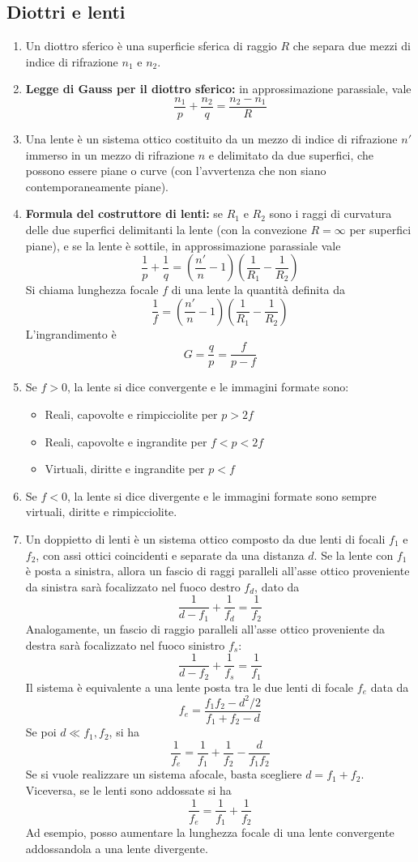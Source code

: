 \documentclass[a4paper,11pt]{article}
\begin{document}
\subsection{Diottri e lenti}
\begin{enumerate}[resume]
	\item Un diottro sferico è una superficie sferica di raggio $R$ che separa due mezzi di indice di rifrazione $n_1$ e $n_2$.
	\item\textbf{Legge di Gauss per il diottro sferico:} in approssimazione parassiale, vale
	\[\frac{n_1}{p}+\frac{n_2}{q}=\frac{n_2-n_1}{R}\]
	\item Una lente è un sistema ottico costituito da un mezzo di indice di rifrazione $n'$ immerso in un mezzo di rifrazione $n$ e delimitato da due superfici, che possono essere piane o curve (con l'avvertenza che non siano contemporaneamente piane).
	\item\textbf{Formula del costruttore di lenti:} se $R_1$ e $R_2$ sono i raggi di curvatura delle due superfici delimitanti la lente (con la convezione $R=\infty$ per superfici piane), e se la lente è sottile, in approssimazione parassiale vale
	\[\frac{1}{p}+\frac{1}{q}=\left(\frac{n'}{n}-1\right)\left(\frac{1}{R_1}-\frac{1}{R_2}\right)\]
	Si chiama lunghezza focale $f$ di una lente la quantità definita da
	\[\frac{1}{f}=\left(\frac{n'}{n}-1\right)\left(\frac{1}{R_1}-\frac{1}{R_2}\right)\]
	L'ingrandimento è 
	\[G=\frac{q}{p}=\frac{f}{p-f}\]
	\item Se $f>0$, la lente si dice convergente e le immagini formate sono:
	\begin{itemize}
		\item Reali, capovolte e rimpicciolite per $p>2f$
		\item Reali, capovolte e ingrandite per $f<p<2f$
		\item Virtuali, diritte e ingrandite per $p<f$	
	\end{itemize}
	\item Se $f<0$, la lente si dice divergente e le immagini formate sono sempre virtuali, diritte e rimpicciolite.
	\item Un doppietto di lenti è un sistema ottico composto da due lenti di focali $f_1$ e $f_2$, con assi ottici coincidenti e separate da una distanza $d$. Se la lente con $f_1$ è posta a sinistra, allora un fascio di raggi paralleli all'asse ottico proveniente da sinistra sarà focalizzato nel fuoco destro $f_d$, dato da
	\[\frac{1}{d-f_1}+\frac{1}{f_d}=\frac{1}{f_2}\]
	Analogamente, un fascio di raggio paralleli all'asse ottico proveniente da destra sarà focalizzato nel fuoco sinistro $f_s$:	
	\[\frac{1}{d-f_2}+\frac{1}{f_s}=\frac{1}{f_1}\]
	Il sistema è equivalente a una lente posta tra le due lenti di focale $f_e$ data da
	\[f_e=\frac{f_1f_2-d^2/2}{f_1+f_2-d}\]
	Se poi $d\ll f_1,f_2$, si ha
	\[\frac{1}{f_e}=\frac{1}{f_1}+\frac{1}{f_2}-\frac{d}{f_1f_2}\]
	Se si vuole realizzare un sistema afocale, basta scegliere $d=f_1+f_2$. Viceversa, se le lenti sono addossate si ha
	\[\frac{1}{f_e}=\frac{1}{f_1}+\frac{1}{f_2}\]
	Ad esempio, posso aumentare la lunghezza focale di una lente convergente addossandola a una lente divergente.
\end{enumerate}
\end{document}
